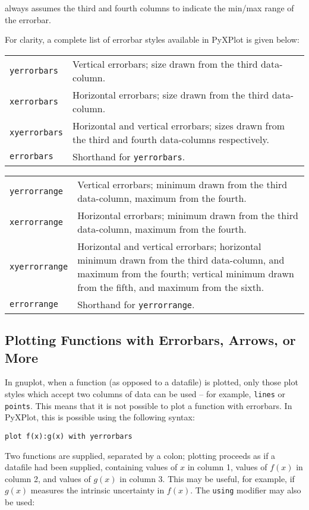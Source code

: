 \noindent always assumes the third and fourth columns to indicate the min/max
range of the errorbar.

\vspace{0.5cm}
For clarity, a complete list of errorbar styles available in PyXPlot is given below:

\begin{tabular}{p{2.5cm}p{7.5cm}}
{\tt yerrorbars} & Vertical errorbars; size drawn from the third data-column. \\
{\tt xerrorbars} & Horizontal errorbars; size drawn from the third data-column. \\
{\tt xyerrorbars} & Horizontal and vertical errorbars; sizes drawn from the third and fourth data-columns respectively.\\
{\tt errorbars} & Shorthand for {\tt yerrorbars}. \\
\end{tabular}

\begin{tabular}{p{2.5cm}p{7.5cm}}
{\tt yerrorrange} & Vertical errorbars; minimum drawn from the third data-column, maximum from the fourth.\\
{\tt xerrorrange} & Horizontal errorbars; minimum drawn from the third data-column, maximum from the fourth.\\
{\tt xyerrorrange} & Horizontal and vertical errorbars; horizontal minimum drawn from the third data-column, and maximum from the fourth; vertical minimum drawn from the fifth, and maximum from the sixth.\\
{\tt errorrange} & Shorthand for {\tt yerrorrange}. \\
\end{tabular}

\subsection{Plotting Functions with Errorbars, Arrows, or More}

In gnuplot, when a function (as opposed to a datafile) is plotted, only those
plot styles which accept two columns of data can be used -- for example,
{\tt lines} or {\tt points}. This means that it is not possible to plot a
function with errorbars. In PyXPlot, this is possible using the following
syntax:

\begin{verbatim}
plot f(x):g(x) with yerrorbars
\end{verbatim}

\noindent Two functions are supplied, separated by a colon; plotting proceeds
as if a datafile had been supplied, containing values of $x$ in column 1,
values of $f(x)$ in column 2, and values of $g(x)$ in column 3. This may be
useful, for example, if $g(x)$ measures the intrinsic uncertainty in $f(x)$.
The {\tt using} modifier may also be used:

